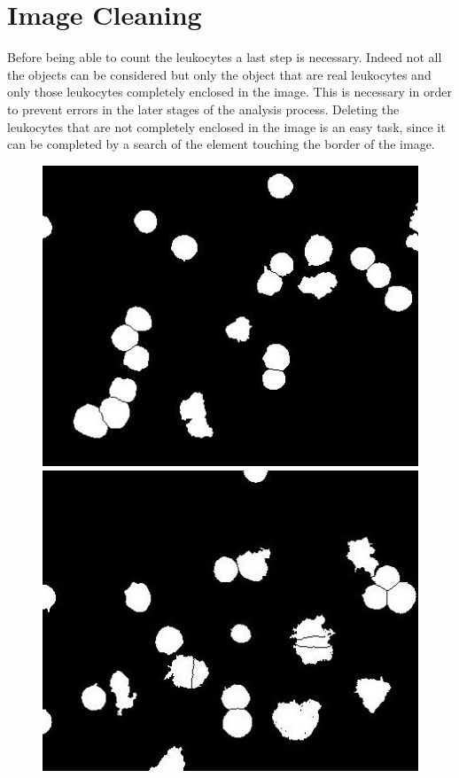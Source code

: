 \documentclass[final,a4paper,12pt,english]{UnicaPhdThesis3}
\begin{document}
{\section{Image Cleaning}
Before being able to count the leukocytes a last step is necessary. Indeed not all the objects can be considered but only the object that are real leukocytes and only those leukocytes completely enclosed in the image. This is necessary in order to prevent errors in the later stages of the analysis process. Deleting the leukocytes that are not completely enclosed in the image is an easy task, since it can be completed by a search of the element touching the border of the image. 

\begin{figure}[!htbp]
\centering
\hspace{-1.5mm}\includegraphics[height=0.23\textheight]{images/Fig13-1}\vspace{1mm}
\includegraphics[height=0.23\textheight]{images/Fig13-2}

\end{figure}}
\end{document}
